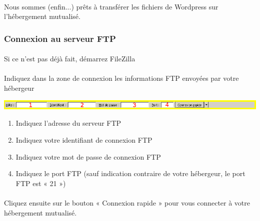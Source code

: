 \documentclass[10pt,a4paper]{article}
\begin{document}
\paragraph{}Nous sommes (enfin...) prêts à transférer les fichiers de Wordpress sur l'hébergement mutualisé.
\subsubsection{Connexion au serveur FTP}
\paragraph{}Si ce n'est pas déjà fait, démarrez FileZilla
\paragraph{}Indiquez dans la zone de connexion les informations FTP envoyées par votre hébergeur
\begin{center}
\includegraphics[scale=0.4]{img/0032.png}
\end{center}
\begin{enumerate}
\item Indiquez l'adresse du serveur FTP
\item Indiquez votre identifiant de connexion FTP
\item Indiquez votre mot de passe de connexion FTP
\item Indiquez le port FTP (sauf indication contraire de votre hébergeur, le port FTP est « 21 »)
\end{enumerate}
\paragraph{}Cliquez ensuite sur le bouton « Connexion rapide » pour vous connecter à votre hébergement mutualisé.
\end{document}
